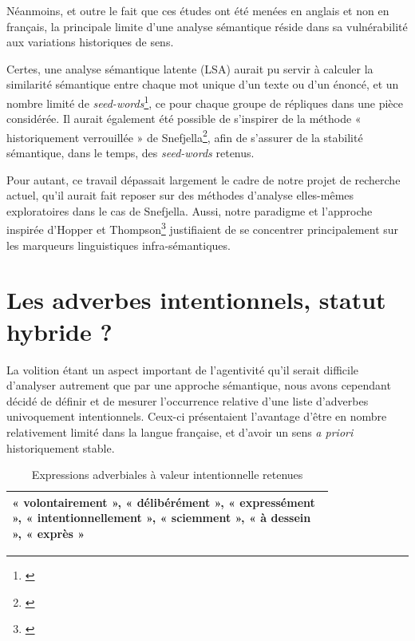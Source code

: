 Néanmoins, et outre le fait que ces études ont été menées en anglais et non en français, la principale limite d’une analyse sémantique réside dans sa vulnérabilité aux variations historiques de sens.

Certes, une analyse sémantique latente (LSA) aurait pu servir à calculer la similarité sémantique entre chaque mot unique d'un texte ou d'un énoncé, et un nombre limité de \textit{seed-words}\footnote{\cite{diuk_quantitative_2012}}, ce pour chaque groupe de répliques dans une pièce considérée. Il aurait également été possible de s’inspirer de la méthode « historiquement verrouillée »  de Snefjella\footnote{\cite{snefjella_historical_2019}}, afin de s'assurer de la stabilité sémantique, dans le temps, des \textit{seed-words} retenus.

Pour autant, ce travail dépassait largement le cadre de notre projet de recherche actuel, qu’il aurait fait reposer sur des méthodes d’analyse elles-mêmes exploratoires dans le cas de Snefjella. Aussi, notre paradigme et l’approche inspirée d’Hopper et Thompson\footnote{\cite{hopper_transitivity_1980}} justifiaient de se concentrer principalement sur les marqueurs linguistiques infra-sémantiques. 

\section{Les adverbes intentionnels, statut hybride ?}

La volition étant un aspect important de l'agentivité qu’il serait difficile d’analyser autrement que par une approche sémantique, nous avons cependant décidé de définir et de mesurer l'occurrence relative d'une liste d'adverbes univoquement intentionnels. Ceux-ci présentaient l'avantage d'être en nombre relativement limité dans la langue française, et d'avoir un sens \textit{a priori }historiquement stable.

\begin{table}[ht]
\caption{Expressions adverbiales à valeur intentionnelle retenues}
\centering
\bigskip
\renewcommand{\arraystretch}{1.5} %
\begin{tabular}{|p{0.8\linewidth}|}
    \hline
     « volontairement », « délibérément », « expressément », « intentionnellement », « sciemment », « à dessein », « exprès »   \\
    \hline
\end{tabular}
 \label{Tab:adv_intention}
\end{table}

